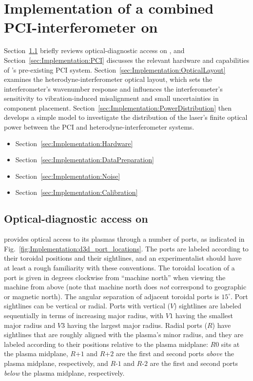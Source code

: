 \chapter{Implementation of a combined PCI-interferometer on \diiid}
\label{ch:Implementation}

Section~\ref{sec:Implementation:d3d_ports} briefly reviews
optical-diagnostic access on \diiid, and
Section~\ref{sec:Implementation:PCI} discusses
the relevant hardware and capabilities
of \diiid's pre-existing PCI system.
Section~\ref{sec:Implementation:OpticalLayout} examines
the heterodyne-interferometer optical layout, which
sets the interferometer's wavenumber response and
influences the interferometer's sensitivity
to vibration-induced misalignment and
small uncertainties in component placement.
Section~\ref{sec:Implementation:PowerDistribution} then develops
a simple model to investigate the distribution
of the laser's finite optical power
between the PCI and heterodyne-interferometer systems.

\begin{itemize}
  \item Section~\ref{sec:Implementation:Hardware}
  \item Section~\ref{sec:Implementation:DataPreparation}
  \item Section~\ref{sec:Implementation:Noise}
  \item Section~\ref{sec:Implementation:Calibration}
\end{itemize}


\section{Optical-diagnostic access on \diiid}
\label{sec:Implementation:d3d_ports}
\diiid \space provides optical access to its plasmas
through a number of ports, as indicated in
Fig.~\ref{fig:Implementation:d3d_port_locations}.
The ports are labeled according to their
toroidal positions and their sightlines, and
an experimentalist should have at least
a rough familiarity with these conventions.
The toroidal location of a port
is given in degrees clockwise from ``machine north''
when viewing the machine from above
(note that machine north does \emph{not} correspond
to geographic or magnetic north).
The angular separation of adjacent toroidal ports is $15^{\circ}$.
Port sightlines can be vertical or radial.
Ports with vertical ($V$) sightlines
are labeled sequentially in terms of increasing major radius,
with $V1$ having the smallest major radius and
$V3$ having the largest major radius.
Radial ports ($R$) have sightlines
that are roughly aligned with the plasma's minor radius, and
they are labeled according to their positions
relative to the plasma midplane:
$R0$ sits at the plasma midplane,
{$R$+$1$} and {$R$+$2$} are the first and second ports
\emph{above} the plasma midplane, respectively, and
{$R$-$1$} and {$R$-$2$} are the first and second ports
\emph{below} the plasma midplane, respectively.

